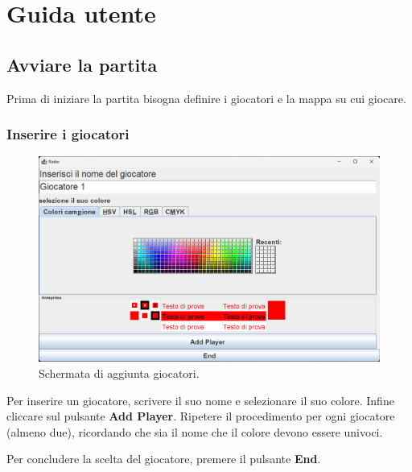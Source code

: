 \documentclass[a4paper,12pt]{report}
\begin{document}
\appendix
\chapter{Guida utente}
\section{Avviare la partita}
Prima di iniziare la partita bisogna definire i giocatori e la mappa su cui giocare.
\subsection{Inserire i giocatori}
\begin{figure}[H]
	\centering
	\includegraphics[width=1\textwidth]{user_guide/1_add_player.png}
	\caption{Schermata di aggiunta giocatori.}
\end{figure}
Per inserire un giocatore, scrivere il suo nome e selezionare il suo colore. Infine cliccare sul pulsante \textbf{Add Player}.
Ripetere il procedimento per ogni giocatore (almeno due), ricordando che sia il nome che il colore devono essere univoci.

Per concludere la scelta del giocatore, premere il pulsante \textbf{End}.
\end{document}
